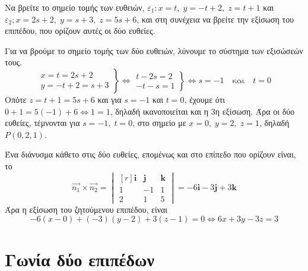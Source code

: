 \begin{example}
  Να βρείτε το σημείο τομής των ευθειών, $ \varepsilon _{1}: x=t, \; y=-t+2, \;
  z=t+1$ και $ \varepsilon _{2}; x=2s+2, \; y=s+3, \; z=5s+6 $, και στη συνέχεια να 
  βρείτε την εξίσωση του επιπέδου, που ορίζουν αυτές οι δύο ευθείες.
\end{example}
\begin{solution}
  Για να βρούμε το σημείο τομής των δύο ευθειών, λύνουμε το σύστημα των εξισώσεών τους.
  \[
    \left.
      \begin{matrix}
        x=t=2s+2 \\
        y=-t+2=s+3
      \end{matrix} 
    \right\} \Leftrightarrow 
    \left.
      \begin{matrix}
        t-2s=2 \\
        -t-s=1
      \end{matrix} 
    \right\} \Leftrightarrow s=-1 \quad \text{και} \quad t=0
  \] 
  Οπότε $ z=t+1=5s+6 $ και για $ s=-1 $ και $ t=0 $, έχουμε ότι $ 0+1=5(-1)+6
  \Leftrightarrow 1 = 1 $, δηλαδή ικανοποιείται και η 3η εξίσωση. Άρα οι δύο 
  ευθείες, τέμνονται για $ s=-1, \; t=0 $, στο σημείο με $ x=0, \; y=2, \; z=1 $, 
  δηλαδή $ P(0,2,1) $.

  Ένα διάνυσμα κάθετο στις δύο ευθείες, επομένως και στο επίπεδο που ορίζουν είναι, το
  \[
    \vec{n_{1}} \times \vec{n_{2}} = 
    \begin{vmatrix*}[r]
      \mathbf{i} & \mathbf{j} & \mathbf{k} \\
      1 & -1 & 1 \\
      2 & 1 & 5 
    \end{vmatrix*} = -6 \mathbf{i}-3 \mathbf{j}+3 \mathbf{k}
  \]  
  Άρα η εξίσωση του ζητούμενου επιπέδου, είναι 
  \[
    -6(x-0)+(-3)(y-2)+3(z-1)=0 \Leftrightarrow 6x+3y-3z=3 
  \]
\end{solution}


\section*{Γωνία δύο επιπέδων}


